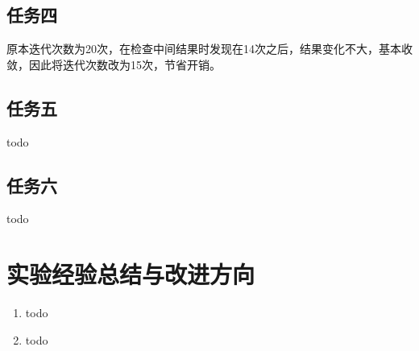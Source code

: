 \documentclass[a4paper,UTF8]{article}
\numberwithin{equation}{section}
\begin{document}
\subsection{任务四}
原本迭代次数为20次，在检查中间结果时发现在14次之后，结果变化不大，基本收敛，因此将迭代次数改为15次，节省开销。
\subsection{任务五}
todo

\subsection{任务六}
todo
\section{实验经验总结与改进方向}
\begin{enumerate}[1)]
    \item todo
    \item todo
\end{enumerate}


\end{document}

